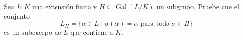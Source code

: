 Sea $L:K$ una extensión finita y $H\subseteq\operatorname{Gal}(L/K)$ un subgrupo. Pruebe que el conjunto
\[L_{H}=\{\alpha\in L\mid \sigma(\alpha)=\alpha\text{ para todo }\sigma\in H\}\]
es un subcuerpo de $L$ que contiene a $K$.

